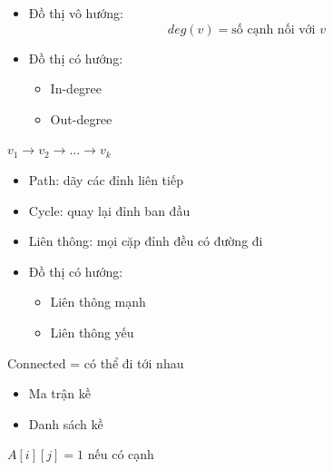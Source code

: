 \documentclass{beamer}
\newcommand{\hlblue}[1]{\textcolor{myblue}{#1}}
\newcommand{\hlgreen}[1]{\textcolor{mygreen}{#1}}
\newcommand{\hlred}[1]{\textcolor{myred}{#1}}
\newcommand{\hlpurple}[1]{\textcolor{mypurple}{#1}}
\begin{document}
\begin{frame}{}
\begin{itemize}
\item Đồ thị vô hướng:
\[
deg(v) = \text{số cạnh nối với } v
\]

\item Đồ thị có hướng:
\begin{itemize}
\item In-degree
\item Out-degree
\end{itemize}
\end{itemize}
\end{frame}


\begin{frame}{}
\begin{tcolorbox}
\centering
\hlpurple{$v_1 \rightarrow v_2 \rightarrow \dots \rightarrow v_k$}
\end{tcolorbox}

\begin{itemize}
\item \hlblue{Path}: dãy các đỉnh liên tiếp
\item \hlred{Cycle}: quay lại đỉnh ban đầu
\end{itemize}
\end{frame}


\begin{frame}{}
\begin{itemize}
\item \hlblue{Liên thông}: mọi cặp đỉnh đều có đường đi
\item Đồ thị có hướng:
\begin{itemize}
\item Liên thông mạnh
\item Liên thông yếu
\end{itemize}
\end{itemize}

\begin{tcolorbox}
\centering
\hlgreen{Connected = có thể đi tới nhau}
\end{tcolorbox}
\end{frame}


\begin{frame}{}
\begin{itemize}
\item \hlblue{Ma trận kề}
\item \hlblue{Danh sách kề}
\end{itemize}

\begin{tcolorbox}
\centering
\hlpurple{$A[i][j] = 1$ nếu có cạnh}
\end{tcolorbox}
\end{frame}
\end{document}
